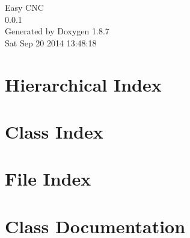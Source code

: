 \documentclass[twoside]{book}
\newcommand{\+}{\discretionary{\mbox{\scriptsize$\hookleftarrow$}}{}{}}
\newcommand{\clearemptydoublepage}{%
  \newpage{\pagestyle{empty}\cleardoublepage}%
}
\begin{document}
\hypersetup{pageanchor=false,
             bookmarks=true,
             bookmarksnumbered=true,
             pdfencoding=unicode
            }
\begin{titlepage}
\vspace*{7cm}
\begin{center}%
{\Large Easy C\+N\+C \\[1ex]\large 0.\+0.\+1 }\\
\vspace*{1cm}
{\large Generated by Doxygen 1.8.7}\\
\vspace*{0.5cm}
{\small Sat Sep 20 2014 13:48:18}\\
\end{center}
\end{titlepage}
\clearemptydoublepage
\tableofcontents
\clearemptydoublepage
{}
\hypersetup{pageanchor=true}

\chapter{Hierarchical Index}

\chapter{Class Index}

\chapter{File Index}

\chapter{Class Documentation}










\end{document}
